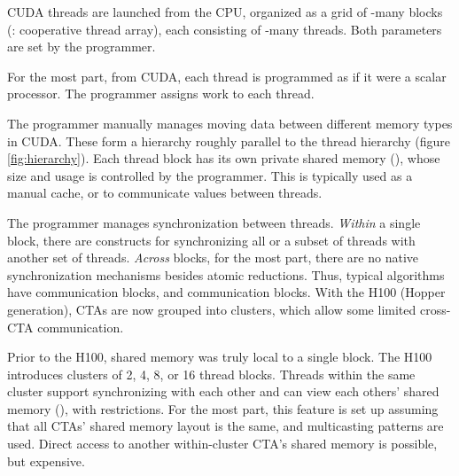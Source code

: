 \filbreak
{} CUDA threads are launched from the CPU, organized as a grid of -many blocks (: cooperative thread array), each consisting of -many threads.
Both parameters are set by the programmer.

\filbreak
{} For the most part, from CUDA, each thread is programmed as if it were a scalar processor.
The programmer assigns work to each thread.

\filbreak
{} The programmer manually manages moving data between different memory types in CUDA.
These form a hierarchy roughly parallel to the thread hierarchy (figure \ref{fig:hierarchy}).
Each thread block has its own private shared memory (), whose size and usage is controlled by the programmer.
This is typically used as a manual cache, or to communicate values between threads.

\filbreak
{}
  The programmer manages synchronization between threads.
  \textit{Within} a single block, there are constructs for synchronizing all or a subset of threads with another set of threads.
  \textit{Across} blocks, for the most part, there are no native synchronization mechanisms besides atomic reductions.
  Thus, typical algorithms have  communication  blocks, and  communication  blocks.
  With the H100 (Hopper generation), CTAs are now grouped into clusters, which allow some limited cross-CTA communication.

\filbreak
{}

Prior to the H100, shared memory was truly local to a single block.
The H100 introduces clusters of 2, 4, 8, or 16 thread blocks.
Threads within the same cluster support synchronizing with each other and can view each others' shared memory (), with restrictions.
For the most part, this feature is set up assuming that all CTAs' shared memory layout is the same, and multicasting patterns are used.
Direct access to another within-cluster CTA's shared memory is possible, but expensive.

\filbreak
{}

\filbreak
{}

\filbreak
{}

\filbreak
{}

\filbreak
{}

\filbreak
{}


